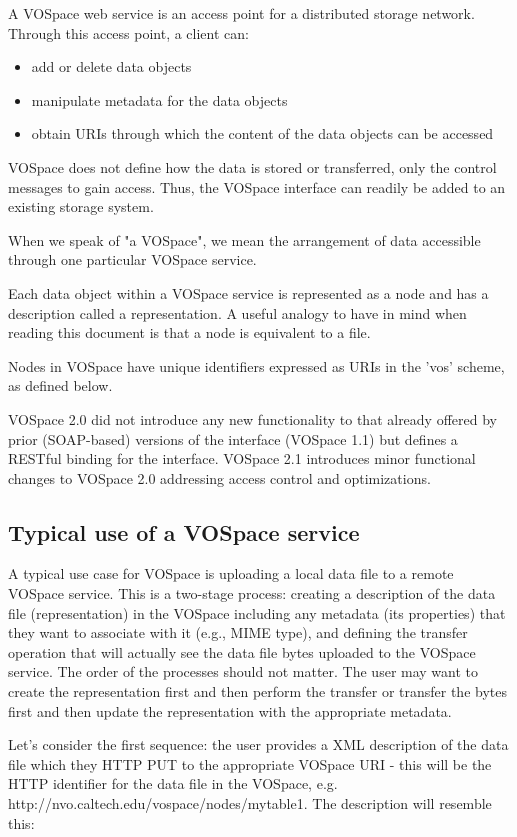 \documentclass[11pt,a4paper]{ivoa}
\begin{document}
A VOSpace web service is an access point for a distributed storage network. Through this access point, a client can:

\begin{itemize}
    \item add or delete data objects
    \item manipulate metadata for the data objects
    \item obtain URIs through which the content of the data objects can be accessed
\end{itemize}
VOSpace does not define how the data is stored or transferred, only the control messages to gain access. Thus, the VOSpace interface can readily be added to an existing storage system.

When we speak of "a VOSpace", we mean the arrangement of data accessible through one particular VOSpace service.

Each data object within a VOSpace service is represented as a node and has a description called a representation. A useful analogy to have in mind when reading this document is that a node is equivalent to a file.

Nodes in VOSpace have unique identifiers expressed as URIs in the 'vos' scheme, as defined below.

VOSpace 2.0 did not introduce any new functionality to that already offered by prior (SOAP-based) versions of the interface (VOSpace 1.1) but defines a RESTful binding for the interface. VOSpace 2.1 introduces minor functional changes to VOSpace 2.0 addressing access control and optimizations.

\subsection{Typical use of a VOSpace service}
\label{subsec:typical use of a vospace service}
A typical use case for VOSpace is uploading a local data file to a remote VOSpace service. This is a two-stage process: creating a description of the data file (representation) in the VOSpace including any metadata (its properties) that they want to associate with it (e.g., MIME type), and defining the transfer operation that will actually see the data file bytes uploaded to the VOSpace service. The order of the processes should not matter. The user may want to create the representation first and then perform the transfer or transfer the bytes first and then update the representation with the appropriate metadata.

Let's consider the first sequence: the user provides a XML description of the data file which they HTTP PUT to the appropriate VOSpace URI - this will be the HTTP identifier for the data file in the VOSpace, e.g. http://nvo.caltech.edu/vospace/nodes/mytable1. The description will resemble this:
\end{document}
